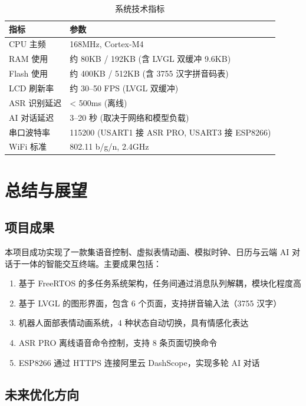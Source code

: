 \documentclass[12pt,a4paper]{ctexart}
\begin{document}
\begin{table}[H]
\centering
\begin{tabularx}{\textwidth}{lX}
\toprule
\textbf{指标} & \textbf{参数} \\
\midrule
CPU 主频 & 168MHz, Cortex-M4 \\
RAM 使用 & 约 80KB / 192KB (含 LVGL 双缓冲 9.6KB) \\
Flash 使用 & 约 400KB / 512KB (含 3755 汉字拼音码表) \\
LCD 刷新率 & 约 30--50 FPS (LVGL 双缓冲) \\
ASR 识别延迟 & < 500ms (离线) \\
AI 对话延迟 & 3--20 秒 (取决于网络和模型负载) \\
串口波特率 & 115200 (USART1 接 ASR PRO, USART3 接 ESP8266) \\
WiFi 标准 & 802.11 b/g/n, 2.4GHz \\
\bottomrule
\end{tabularx}
\caption{系统技术指标}
\end{table}

\section{总结与展望}

\subsection{项目成果}

本项目成功实现了一款集语音控制、虚拟表情动画、模拟时钟、日历与云端 AI 对话于一体的智能交互终端。主要成果包括：

\begin{enumerate}
    \item 基于 FreeRTOS 的多任务系统架构，任务间通过消息队列解耦，模块化程度高
    \item 基于 LVGL 的图形界面，包含 6 个页面，支持拼音输入法（3755 汉字）
    \item 机器人面部表情动画系统，4 种状态自动切换，具有情感化表达
    \item ASR PRO 离线语音命令控制，支持 8 条页面切换命令
    \item ESP8266 通过 HTTPS 连接阿里云 DashScope，实现多轮 AI 对话
\end{enumerate}

\subsection{未来优化方向}
\end{document}

